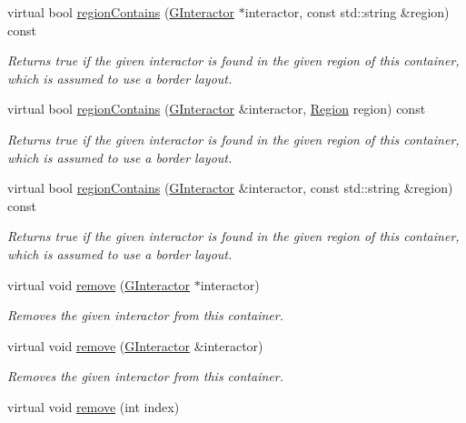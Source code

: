 \begin{DoxyCompactItemize}
virtual bool \mbox{\hyperlink{classGContainer_a84a56bae6b8883d27e44d51c31b2bfc5}{region\+Contains}} (\mbox{\hyperlink{classGInteractor}{G\+Interactor}} $\ast$interactor, const std\+::string \&region) const
\begin{DoxyCompactList}\small\item\em Returns true if the given interactor is found in the given region of this container, which is assumed to use a border layout. \end{DoxyCompactList}\item 
virtual bool \mbox{\hyperlink{classGContainer_aa4cf95952747fd421a2b005eedbc662c}{region\+Contains}} (\mbox{\hyperlink{classGInteractor}{G\+Interactor}} \&interactor, \mbox{\hyperlink{classGContainer_a81a01a86de31071a92e6cce0bab9bc4b}{Region}} region) const
\begin{DoxyCompactList}\small\item\em Returns true if the given interactor is found in the given region of this container, which is assumed to use a border layout. \end{DoxyCompactList}\item 
virtual bool \mbox{\hyperlink{classGContainer_ad67deacd62d3248fbe57ccbd4e96fb50}{region\+Contains}} (\mbox{\hyperlink{classGInteractor}{G\+Interactor}} \&interactor, const std\+::string \&region) const
\begin{DoxyCompactList}\small\item\em Returns true if the given interactor is found in the given region of this container, which is assumed to use a border layout. \end{DoxyCompactList}\item 
virtual void \mbox{\hyperlink{classGContainer_a1c12b1fde5c2ef10d79d4ee51e670efa}{remove}} (\mbox{\hyperlink{classGInteractor}{G\+Interactor}} $\ast$interactor)
\begin{DoxyCompactList}\small\item\em Removes the given interactor from this container. \end{DoxyCompactList}\item 
virtual void \mbox{\hyperlink{classGContainer_ade2376c458ac401a0bd2dbe44271509e}{remove}} (\mbox{\hyperlink{classGInteractor}{G\+Interactor}} \&interactor)
\begin{DoxyCompactList}\small\item\em Removes the given interactor from this container. \end{DoxyCompactList}\item 
virtual void \mbox{\hyperlink{classGContainer_a2ad1aa316f278b2e9fa8121504749652}{remove}} (int index)

\end{DoxyCompactItemize}
